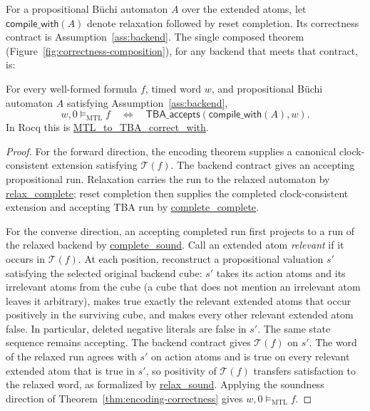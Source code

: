 \documentclass[manuscript]{acmart}
\newcommand{\satM}{\models_{\mathrm{MTL}}}
\newcommand{\T}{\mathcal{T}}
\newcommand{\Rocqid}[1]{\url{#1}}
\begin{document}
For a propositional B\"uchi automaton $A$ over the extended atoms, let
$\mathsf{compile\_with}(A)$ denote relaxation followed by reset completion.
Its correctness contract is Assumption~\ref{ass:backend}. The single composed
theorem (Figure~\ref{fig:correctness-composition}), for any backend that meets
that contract, is:
\begin{theorem}
\label{thm:mtl-to-tba-correct}
For every well-formed formula $f$, timed word $w$, and propositional
B\"uchi automaton $A$ satisfying Assumption~\ref{ass:backend},
\[
w,0\satM f
\quad\Longleftrightarrow\quad
\mathsf{TBA\_accepts}(\mathsf{compile\_with}(A),w).
\]
In Rocq this is \Rocqid{MTL_to_TBA_correct_with}.
\end{theorem}
\begin{proof}
For the forward direction, the encoding theorem supplies a canonical clock-consistent
extension satisfying $\T(f)$. The backend contract gives an accepting
propositional run. Relaxation carries the run to the relaxed automaton by
\Rocqid{relax_complete}; reset completion then supplies the completed
clock-consistent extension and accepting TBA run by
\Rocqid{complete_complete}.

For the converse direction, an accepting completed run first projects to a run of the
relaxed backend by \Rocqid{complete_sound}. Call an extended atom
\emph{relevant} if it occurs in $\T(f)$. At each position, reconstruct a
propositional valuation $s'$ satisfying the selected original backend cube: $s'$
takes its action atoms and its irrelevant atoms from the cube (a cube that does
not mention an irrelevant atom leaves it arbitrary), makes true exactly the
relevant extended atoms that occur positively in the surviving cube, and makes
every other relevant extended atom false. In particular, deleted negative
literals are false in $s'$. The same state sequence remains accepting. The
backend contract gives $\T(f)$ on $s'$. The word of the relaxed run agrees with
$s'$ on action atoms and is true on every relevant extended atom that is true in
$s'$, so positivity of $\T(f)$ transfers satisfaction to the relaxed word, as formalized by
\Rocqid{relax_sound}. Applying the soundness direction of
Theorem~\ref{thm:encoding-correctness} gives $w,0\satM f$.
\end{proof}
\end{document}
